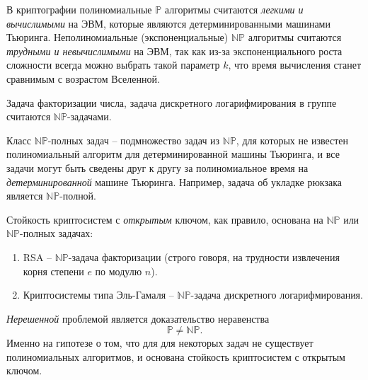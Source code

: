\documentclass[10pt,a4paper]{book}
\newcommand{\set}[1]{\mathbb{#1}}
\begin{document}
В криптографии полиномиальные $\set{P}$ алгоритмы считаются \emph{легкими и вычислимыми} на ЭВМ, которые являются детерминированными машинами Тьюринга. Неполиномиальные (экспоненциальные) $\set{NP}$ алгоритмы считаются \emph{трудными и невычислимыми} на ЭВМ, так как из-за экспоненциального роста сложности всегда можно выбрать такой параметр $k$, что время вычисления станет сравнимым с возрастом Вселенной.

Задача факторизации числа, задача дискретного логарифмирования в группе считаются $\set{NP}$-задачами.

Класс $\set{NP}$-полных задач -- подмножество задач из $\set{NP}$, для которых не известен полиномиальный алгоритм для детерминированной машины Тьюринга, и все задачи могут быть сведены друг к другу за полиномиальное время на \emph{детерминированной} машине Тьюринга. Например, задача об укладке рюкзака является $\set{NP}$-полной.

Стойкость криптосистем с \emph{открытым} ключом, как правило, основана на $\set{NP}$ или $\set{NP}$-полных задачах:
\begin{enumerate}
    \item RSA -- $\set{NP}$-задача факторизации (строго говоря, на трудности извлечения корня степени $e$ по модулю $n$).
    \item Криптосистемы типа Эль-Гамаля -- $\set{NP}$-задача дискретного логарифмирования.
\end{enumerate}

\emph{Нерешенной} проблемой является доказательство неравенства
    \[ \set{P} \neq \set{NP}. \]
Именно на гипотезе о том, что для для некоторых задач не существует полиномиальных алгоритмов, и основана стойкость криптосистем с открытым ключом.


\end{document}
